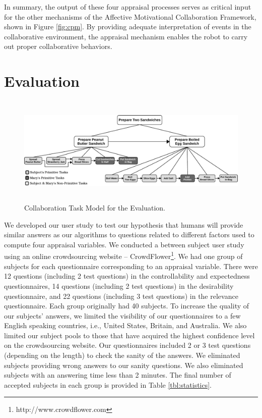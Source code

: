\documentclass{article}
\begin{document}
In summary, the output of these four appraisal processes serves as critical
input for the other mechanisms of the Affective Motivational Collaboration
Framework, shown in Figure \ref{fig:cpm}. By providing adequate interpretation
of events in the collaborative environment, the appraisal mechanism enables the
robot to carry out proper collaborative behaviors.

\vspace{-2mm}
\section{Evaluation}
\label{sec:user-study}

\begin{figure}
  \centering
  \vspace*{-5mm}
  \includegraphics[width=16cm,height=5.25cm]{figure/taskModel-croped.pdf}
  \vspace*{-3mm}
  \caption{Collaboration Task Model for the Evaluation.}
  \label{fig:taskModel}
  \vspace*{-4mm}
\end{figure}

We developed our user study to test our hypothesis that humans will provide
similar answers as our algorithms to questions related to different factors used
to compute four appraisal variables. We conducted a between subject user study
using an online crowdsourcing website --
CrowdFlower\footnote{http://www.crowdflower.com}. We had one group of
subjects for each questionnaire corresponding to an appraisal variable.
There were 12 questions (including 2 test questions) in the controllability and
expectedness questionnaires, 14 questions (including 2 test questions) in
the desirability questionnaire, and 22 questions (including 3 test questions) in
the relevance questionnaire. Each group originally had 40 subjects. To increase
the quality of our subjects' answers, we limited the visibility of our
questionnaires to a few English speaking countries, i.e., United States,
Britain, and Australia. We also limited our subject pools to those that have
acquired the highest confidence level on the crowdsourcing website. Our
questionnaires included 2 or 3 test questions (depending on the length) to check
the sanity of the answers. We eliminated subjects providing wrong answers to our
sanity questions. We also eliminated subjects with an answering time less than 2
minutes. The final number of accepted subjects in each group is provided in
Table \ref{tbl:statistics}.
\end{document}
